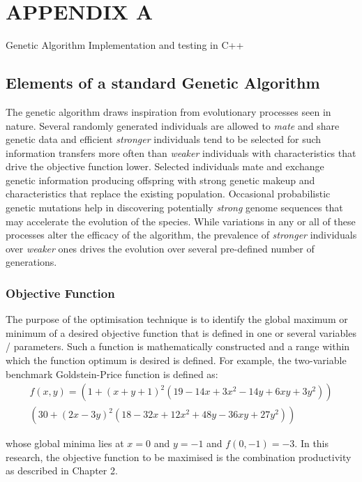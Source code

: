 \documentclass[ExampleMasters.tex]{subfiles}
\begin{document}
	\chapter{APPENDIX A}
	{\Large Genetic Algorithm Implementation and testing in C++}

	\section{Elements of a standard Genetic Algorithm}
		The genetic algorithm draws inspiration from evolutionary processes seen in nature. Several randomly generated individuals are allowed to \textit{mate} and share genetic data and efficient \textit{stronger} individuals tend to be selected for such information transfers more often than \textit{weaker} individuals with characteristics that drive the objective function lower. Selected individuals mate and exchange genetic information producing offspring with strong genetic makeup and characteristics that replace the existing population. Occasional probabilistic genetic mutations help in discovering potentially \textit{strong} genome sequences that may accelerate the evolution of the species. While variations in any or all of these processes alter the efficacy of the algorithm, the prevalence of \textit{stronger} individuals over \textit{weaker} ones drives the evolution over several pre-defined number of generations.\\

		\subsection{Objective Function}
			The purpose of the optimisation technique is to identify the global maximum or minimum of a desired objective function that is defined in one or several variables / parameters. Such a function is mathematically constructed and a range within which the function optimum is desired is defined. For example, the two-variable benchmark Goldstein-Price function is defined as:
			\begin{multline}
				f(x,y)=(1+(x+y+1)^2(19-14x+3x^2-14y+6xy+3y^2))\\
					(30+(2x-3y)^2(18-32x+12x^2+48y-36xy+27y^2))
			\end{multline}

			whose global minima lies at $x=0$ and $y=-1$ and $f(0,-1)=-3$. In this research, the objective function to be maximised is the combination productivity as described in Chapter 2.\\
\end{document}
